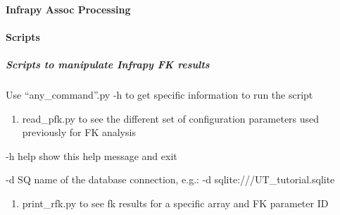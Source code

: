 \documentclass[letterpaper,10pt,english]{sphinxmanual}
\begin{document}
\begin{sphinxVerbatim}[commandchars=\\\{\}]
    
\end{sphinxVerbatim}


\paragraph{Infrapy Assoc Processing}
\label{\detokenize{assoc:infrapy-assoc-processing}}\label{\detokenize{assoc:assoc}}\label{\detokenize{assoc::doc}}
\begin{sphinxVerbatim}[commandchars=\\\{\}]
    
\end{sphinxVerbatim}


\paragraph{Scripts}
\label{\detokenize{scripts:scripts}}\label{\detokenize{scripts:id1}}\label{\detokenize{scripts::doc}}

\subparagraph{Scripts to manipulate Infrapy FK results}
\label{\detokenize{scripts:scripts-to-manipulate-infrapy-fk-results}}
Use “any\_command”.py -h to get specific information to run the script
\begin{enumerate}
\def\theenumi{\arabic{enumi}}
\def\labelenumi{\theenumi .}
\makeatletter\def\p@enumii{\p@enumi \theenumi .}\makeatother
\item {} 
read\_pfk.py to see the different set of configuration parameters used previously for FK analysis

\end{enumerate}

\begin{DUlineblock}{0em}
\item[] -h    \textendash{}help     show this help message and exit
\item[] -d    SQ      name of the database connection, e.g.: -d sqlite:///UT\_tutorial.sqlite
\end{DUlineblock}

\begin{sphinxVerbatim}[commandchars=\\\{\}]
  \PYG{p}{[}\PYG{p}{]}  
\end{sphinxVerbatim}
\begin{enumerate}
\def\theenumi{\arabic{enumi}}
\def\labelenumi{\theenumi .}
\makeatletter\def\p@enumii{\p@enumi \theenumi .}\makeatother
\setcounter{enumi}{1}
\item {} 
print\_rfk.py to see fk results for a specific array and FK parameter ID

\end{enumerate}
\end{document}
